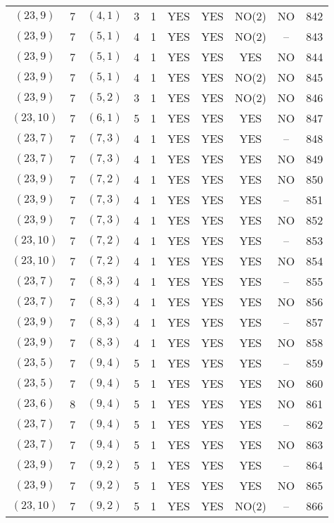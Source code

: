 \begin{longtable}{|c|c|c|c|c|c|c|c|c|c|}
$(23, 9)$ & 7 & $(4, 1)$ & 3 & 1 & YES & YES & NO(2) & NO & 842\\
$(23, 9)$ & 7 & $(5, 1)$ & 4 & 1 & YES & YES & NO(2) & -- & 843\\
$(23, 9)$ & 7 & $(5, 1)$ & 4 & 1 & YES & YES & YES & NO & 844\\
$(23, 9)$ & 7 & $(5, 1)$ & 4 & 1 & YES & YES & NO(2) & NO & 845\\
$(23, 9)$ & 7 & $(5, 2)$ & 3 & 1 & YES & YES & NO(2) & NO & 846\\
$(23, 10)$ & 7 & $(6, 1)$ & 5 & 1 & YES & YES & YES & NO & 847\\
$(23, 7)$ & 7 & $(7, 3)$ & 4 & 1 & YES & YES & YES & -- & 848\\
$(23, 7)$ & 7 & $(7, 3)$ & 4 & 1 & YES & YES & YES & NO & 849\\
$(23, 9)$ & 7 & $(7, 2)$ & 4 & 1 & YES & YES & YES & NO & 850\\
$(23, 9)$ & 7 & $(7, 3)$ & 4 & 1 & YES & YES & YES & -- & 851\\
$(23, 9)$ & 7 & $(7, 3)$ & 4 & 1 & YES & YES & YES & NO & 852\\
$(23, 10)$ & 7 & $(7, 2)$ & 4 & 1 & YES & YES & YES & -- & 853\\
$(23, 10)$ & 7 & $(7, 2)$ & 4 & 1 & YES & YES & YES & NO & 854\\
$(23, 7)$ & 7 & $(8, 3)$ & 4 & 1 & YES & YES & YES & -- & 855\\
$(23, 7)$ & 7 & $(8, 3)$ & 4 & 1 & YES & YES & YES & NO & 856\\
$(23, 9)$ & 7 & $(8, 3)$ & 4 & 1 & YES & YES & YES & -- & 857\\
$(23, 9)$ & 7 & $(8, 3)$ & 4 & 1 & YES & YES & YES & NO & 858\\
$(23, 5)$ & 7 & $(9, 4)$ & 5 & 1 & YES & YES & YES & -- & 859\\
$(23, 5)$ & 7 & $(9, 4)$ & 5 & 1 & YES & YES & YES & NO & 860\\
$(23, 6)$ & 8 & $(9, 4)$ & 5 & 1 & YES & YES & YES & NO & 861\\
$(23, 7)$ & 7 & $(9, 4)$ & 5 & 1 & YES & YES & YES & -- & 862\\
$(23, 7)$ & 7 & $(9, 4)$ & 5 & 1 & YES & YES & YES & NO & 863\\
$(23, 9)$ & 7 & $(9, 2)$ & 5 & 1 & YES & YES & YES & -- & 864\\
$(23, 9)$ & 7 & $(9, 2)$ & 5 & 1 & YES & YES & YES & NO & 865\\
$(23, 10)$ & 7 & $(9, 2)$ & 5 & 1 & YES & YES & NO(2) & -- & 866\\

\end{longtable}
